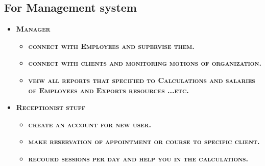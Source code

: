 \documentclass[../Psychological_system_web_application.tex]{subfiles}
\begin{document}
				\subsection{For Management system}
					\begin{itemize}
							\item
								\textbf{\textsc{\color{red}Manager}}
									\begin{itemize}
						\item
							\textbf{\textsc{\color{blue}connect with Employees and supervise them.}}
						\item
							\textbf{\textsc{\color{blue}connect with clients and monitoring motions of organization.}}
						\item
							\textbf{\textsc{\color{blue}veiw all reports that specified to Calculations and salaries of Employees and Exports resources ...etc.}}
						
					\end{itemize}
							\item
								\textbf{\textsc{\color{red}Receptionist stuff}}
									\begin{itemize}
										\item
											\textbf{\textsc{\color{blue}create an account for new user.}}
										\item
											\textbf{\textsc{\color{blue}make reservation of appointment or course to specific client.}}
										\item
											\textbf{\textsc{\color{blue}recourd sessions per day and help you in the calculations.}}
						
									\end{itemize}
					\end{itemize}
				
\end{document}

